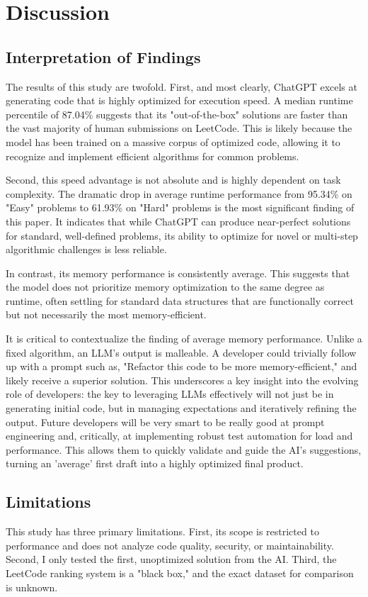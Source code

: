 \documentclass[12pt, a4paper]{article}
\begin{document}
\section{Discussion}

\subsection{Interpretation of Findings}
The results of this study are twofold. First, and most clearly, ChatGPT excels at generating code that is highly optimized for execution speed. A median runtime percentile of 87.04\% suggests that its "out-of-the-box" solutions are faster than the vast majority of human submissions on LeetCode. This is likely because the model has been trained on a massive corpus of optimized code, allowing it to recognize and implement efficient algorithms for common problems.

Second, this speed advantage is not absolute and is highly dependent on task complexity. The dramatic drop in average runtime performance from 95.34\% on "Easy" problems to 61.93\% on "Hard" problems is the most significant finding of this paper. It indicates that while ChatGPT can produce near-perfect solutions for standard, well-defined problems, its ability to optimize for novel or multi-step algorithmic challenges is less reliable.

In contrast, its memory performance is consistently average. This suggests that the model does not prioritize memory optimization to the same degree as runtime, often settling for standard data structures that are functionally correct but not necessarily the most memory-efficient.

It is critical to contextualize the finding of average memory performance. Unlike a fixed algorithm, an LLM's output is malleable. A developer could trivially follow up with a prompt such as, "Refactor this code to be more memory-efficient," and likely receive a superior solution. This underscores a key insight into the evolving role of developers: the key to leveraging LLMs effectively will not just be in generating initial code, but in managing expectations and iteratively refining the output. Future developers will be very smart to be really good at prompt engineering and, critically, at implementing robust test automation for load and performance. This allows them to quickly validate and guide the AI's suggestions, turning an 'average' first draft into a highly optimized final product.

\subsection{Limitations}
This study has three primary limitations. First, its scope is restricted to performance and does not analyze code quality, security, or maintainability. Second, I only tested the first, unoptimized solution from the AI. Third, the LeetCode ranking system is a "black box," and the exact dataset for comparison is unknown.
\end{document}
